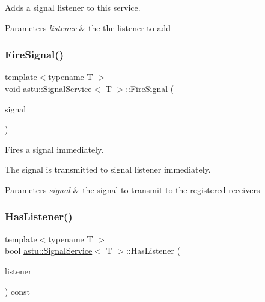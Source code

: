 Adds a signal listener to this service.


\begin{DoxyParams}{Parameters}
{\em listener} & the the listener to add \\
\hline
\end{DoxyParams}
\mbox{\label{classastu_1_1SignalService_a3ead09955e8e76bbdd6d9e5a853e88af}} 
\subsubsection{\texorpdfstring{Fire\+Signal()}{FireSignal()}}
{\footnotesize\ttfamily template$<$typename T $>$ \\
void \hyperlink{classastu_1_1SignalService}{astu\+::\+Signal\+Service}$<$ T $>$\+::Fire\+Signal (\begin{DoxyParamCaption}\item[{const T \&}]{signal }\end{DoxyParamCaption})\hspace{0.3cm}{\ttfamily [inline]}}

Fires a signal immediately.

The signal is transmitted to signal listener immediately.


\begin{DoxyParams}{Parameters}
{\em signal} & the signal to transmit to the registered receivers \\
\hline
\end{DoxyParams}
\mbox{\label{classastu_1_1SignalService_acc4935715afef10b89fd905e714be389}} 
\subsubsection{\texorpdfstring{Has\+Listener()}{HasListener()}\hspace{0.1cm}{\footnotesize\ttfamily [1/2]}}
{\footnotesize\ttfamily template$<$typename T $>$ \\
bool \hyperlink{classastu_1_1SignalService}{astu\+::\+Signal\+Service}$<$ T $>$\+::Has\+Listener (\begin{DoxyParamCaption}\item[{const std\+::shared\+\_\+ptr$<$ \hyperlink{classastu_1_1ISignalListener}{I\+Signal\+Listener}$<$ T $>$$>$ \&}]{listener }\end{DoxyParamCaption}) const\hspace{0.3cm}{\ttfamily [inline]}}


